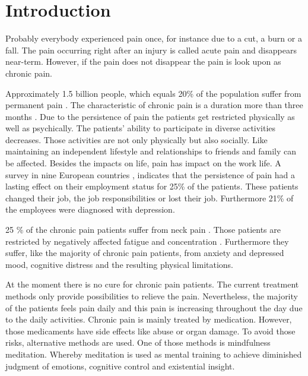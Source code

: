 \chapter{Introduction}

Probably everybody experienced pain once, for instance due to a cut, a burn or a fall. The pain occurring right after an injury is called acute pain and disappears near-term. However, if the pain does not disappear the pain is look upon as chronic pain. \cite{Briggs2010,Mello2016}

Approximately 1.5 billion people, which equals 20\% of the population suffer from permanent pain \cite{Zeidan2016,Macfarlanea2016}. The characteristic of chronic pain is a duration more than three months \cite{Mello2016}. Due to the persistence of pain the patients get restricted physically as well as psychically. 
The patients' ability to participate in diverse activities decreases. Those activities are not only physically but also socially. Like maintaining an independent lifestyle and relationships to friends and family can be affected. Besides the impacts on life, pain has impact on the work life. A survey in nine European countries  , indicates that the persistence of pain had a lasting effect on their employment status for 25\% of the patients. These patients changed their job, the job responsibilities or lost their job. Furthermore  21\% of the employees were diagnosed with depression. \cite{Breivik2006} 

25 \% of the chronic pain patients suffer from neck pain \cite{Macfarlanea2016}. Those patients are restricted by negatively affected fatigue and concentration \cite{vanRanderaat2016}. Furthermore they suffer, like the majority of chronic pain patients, from anxiety and depressed mood, cognitive distress and the resulting physical limitations. \cite{gross2013}

At the moment there is no cure for chronic pain patients. The current treatment methods only provide possibilities to relieve the pain. \cite{marcus2009,pope2017} Nevertheless, the majority of the patients feels pain daily and this pain is increasing throughout the day due to the daily activities. \cite{Breivik2006}
Chronic pain is mainly treated by medication. However, those medicaments have side effects like abuse or organ damage. To avoid those risks, alternative methods are used. One of those methods is mindfulness meditation. Whereby meditation is used as mental training to achieve diminished judgment of emotions, cognitive control and existential insight. \cite{Zeidan2012}


